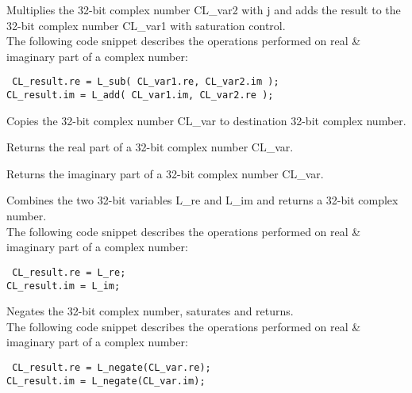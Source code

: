 
Multiplies the 32-bit complex number CL\_var2 with j and adds the result to the 32-bit complex number CL\_var1 with saturation control.\\
The following code snippet describes the operations performed on real \& imaginary part of a complex number:

{\tt {} CL\_result.re = L\_sub( CL\_var1.re, CL\_var2.im );\\
 CL\_result.im = L\_add( CL\_var1.im, CL\_var2.re );
}


Copies the 32-bit complex number CL\_var to destination 32-bit complex number.


Returns the real part of a 32-bit complex number CL\_var.


Returns the imaginary part of a 32-bit complex number CL\_var.


Combines the two 32-bit variables L\_re and L\_im and returns a 32-bit complex number.\\
The following code snippet describes the operations performed on real \& imaginary part of a complex number:

{\tt {} CL\_result.re = L\_re;\\
 CL\_result.im = L\_im;
}


Negates the 32-bit complex number, saturates and returns.\\
The following code snippet describes the operations performed on real \& imaginary part of a complex number:

{\tt {} CL\_result.re = L\_negate(CL\_var.re);\\
 CL\_result.im = L\_negate(CL\_var.im);
}


